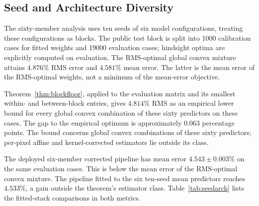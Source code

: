 \documentclass[twoside,11pt]{article}
\newcommand{\saSixtyOracle}{4.581}   %
\newcommand{\saSixtyOracleRms}{4.876}
\newcommand{\saBound}{4.814}         %
\newcommand{\saDeployedEv}{4.543}    %
\newcommand{\saDeployedEvSd}{0.003}
\newcommand{\saPoolPipeline}{4.533}   %
\begin{document}
\subsection{Seed and Architecture Diversity}
\label{sec:seeds-arch}
The sixty-member analysis uses ten seeds of six model configurations, treating these configurations as blocks. The public test block is split into 1000 calibration cases for fitted weights and 19000 evaluation cases; hindsight optima are explicitly computed on evaluation. The RMS-optimal global convex mixture attains $\saSixtyOracleRms\%$ RMS error and $\saSixtyOracle\%$ mean error. The latter is the mean error of the RMS-optimal weights, not a minimum of the mean-error objective.

Theorem~\ref{thm:blockfloor}, applied to the evaluation matrix and its smallest within- and between-block entries, gives $\saBound\%$ RMS as an empirical lower bound for every global convex combination of these sixty predictors on these cases. The gap to the empirical optimum is approximately $0.063$ percentage points. The bound concerns global convex combinations of these sixty predictors; per-pixel affine and kernel-corrected estimators lie outside its class.

The deployed six-member corrected pipeline has mean error $\saDeployedEv\pm\saDeployedEvSd\%$ on the same evaluation cases. This is below the mean error of the RMS-optimal convex mixture. The pipeline fitted to the six ten-seed mean predictors reaches $\saPoolPipeline\%$, a gain outside the theorem's estimator class. Table~\ref{tab:seedarch} lists the fitted-stack comparisons in both metrics.
\end{document}

